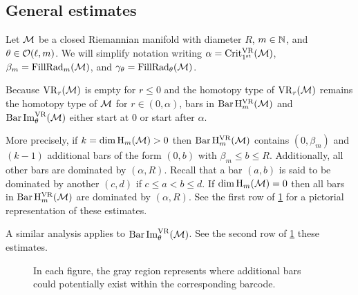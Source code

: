 \subsection{General estimates}\label{ss:barcode_general}

Let \(\mathcal{M}\) be a closed Riemannian manifold with diameter \(R\), \(m \in \mathbb{N}\), and \(\theta \in \mathcal{O}(\ell,m)\).
We will simplify notation writing \(\alpha = \operatorname{Crit^{\mathrm{VR}}_{1^{\mathrm{st}}}}(\mathcal{M})\), \(\beta_m = \operatorname{FillRad}_{m}(\mathcal{M})\), and \(\gamma_\theta = \operatorname{FillRad}_{\theta}(\mathcal{M})\).

Because $\mathrm{VR}_r(\mathcal{M})$ is empty for \(r \leq 0\) and the homotopy type of $\mathrm{VR}_r(\mathcal{M})$ remains the homotopy type of $\mathcal{M}$ for $r \in (0, \alpha)$, bars in \(\operatorname{Bar} \mathrm{H}_m^{\mathrm{VR}}(\mathcal{M})\) and $\operatorname{Bar}\operatorname{Im}_\theta^{\mathrm{VR}}(\mathcal{M})$ either start at $0$ or start after $\alpha$.

More precisely,
if \(k = \dim \operatorname{H}_m(\mathcal{M}) > 0\) then $\operatorname{Bar}\mathrm{H}_m^{\mathrm{VR}}(\mathcal{M})$ contains $(0, \beta_m)$ and \((k - 1)\) additional bars of the form \((0, b)\) with \(\beta_m \leq b \leq R\).
Additionally, all other bars are dominated by \((\alpha, R)\).
Recall that a bar $(a, b)$ is said to be dominated by another $(c,d)$ if $c \leq a < b \leq d$.
If \(\dim \operatorname{H}_m(\mathcal{M}) = 0\) then all bars in \(\operatorname{Bar}\mathrm{H}_m^{\mathrm{VR}}(\mathcal{M})\) are dominated by \((\alpha, R)\).
See the first row of \cref{fig:barcodes_general} for a pictorial representation of these estimates.

A similar analysis applies to $\operatorname{Bar}\operatorname{Im}_\theta^{\mathrm{VR}}(\mathcal{M})$.
See the second row of \cref{fig:barcodes_general} these estimates.

\begin{figure}
	\centering
	
	\caption{In each figure, the gray region represents where additional bars could potentially exist within the corresponding barcode.}
	\label{fig:barcodes_general}
\end{figure}